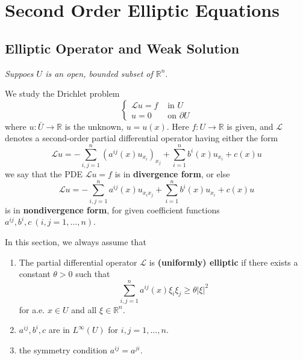 \chapter{Second Order Elliptic Equations}

\section{Elliptic Operator and Weak Solution} %
\emph{ Suppoes $U$ is an open, bounded subset of $\mathbb{R}^n$}.
\begin{definition}
    We study the Drichlet problem
    \begin{equation*}
        \left\{
        \begin{aligned}
            \mathcal{L}u=f & \text { in } U          \\
            u=0            & \text { on } \partial U
        \end{aligned}
        \right.
    \end{equation*}
    where $u: \bar{U} \rightarrow \mathbb{R}$ is the unknown, $u=u(x)$. Here $f: U \rightarrow \mathbb{R}$ is given, and $\mathcal{L}$ denotes a second-order partial differential operator having either the form
    \begin{equation*}
        \mathcal{L}u
        =
        -\sum_{i, j=1}^n\left(a^{i j}(x) u_{x_i}\right)_{x_j} + \sum_{i=1}^n b^i(x) u_{x_i}+c(x) u
    \end{equation*}
    we say that the PDE $\mathcal{L}u=f$ is in \textbf{divergence form},
    or else
    \begin{equation*}
        \mathcal{L}u
        =
        -\sum_{i, j=1}^n a^{i j}(x) u_{x_i x_j}+\sum_{i=1}^n b^i(x) u_{x_i}+c(x) u
    \end{equation*}
    is in \textbf{nondivergence form},
    for given coefficient functions $a^{i j}, b^i, c \ (i, j=1, \ldots, n)$.

    \begin{remark}
        In this section, we always assume that
        \begin{enumerate}
            \item
                  The partial differential operator $\mathcal{L}$ is \textbf{(uniformly) elliptic} if there exists a constant $\theta>0$ such that
                  \begin{equation*}
                      \sum_{i, j=1}^n a^{i j}(x) \xi_i \xi_j
                      \geq
                      \theta|\xi|^2
                  \end{equation*}
                  for a.e. $x \in U$ and all $\xi \in \mathbb{R}^n$.
            \item  $a^{ij},b^i,c$ are in $L^\infty(U)$ for $i,j=1,\ldots,n$.
            \item
                  the symmetry condition $a^{ij}=a^{ji}$.
        \end{enumerate}
    \end{remark}
\end{definition}





